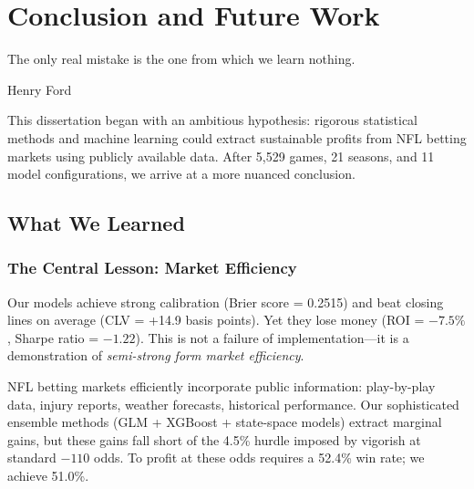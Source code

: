 \chapter{Conclusion and Future Work}
\label{chap:conclusion}

\epigraph{The only real mistake is the one from which we learn nothing.}{Henry Ford}


\begin{herometricrow}
%
\hfill
{}%
\hfill
{}
\end{herometricrow}

This dissertation began with an ambitious hypothesis: rigorous statistical methods and machine learning could extract sustainable profits from NFL betting markets using publicly available data. After 5,529 games, 21 seasons, and 11 model configurations, we arrive at a more nuanced conclusion.

\section{What We Learned}

\subsection{The Central Lesson: Market Efficiency}

Our models achieve strong calibration (Brier score = 0.2515) and beat closing lines on average (CLV = +14.9 basis points). Yet they lose money (ROI = $-7.5\%$, Sharpe ratio = $-1.22$). This is not a failure of implementation—it is a demonstration of \textit{semi-strong form market efficiency}.

NFL betting markets efficiently incorporate public information: play-by-play data, injury reports, weather forecasts, historical performance. Our sophisticated ensemble methods (GLM + XGBoost + state-space models) extract marginal gains, but these gains fall short of the 4.5\% hurdle imposed by vigorish at standard $-110$ odds. To profit at these odds requires a 52.4\% win rate; we achieve 51.0\%.

